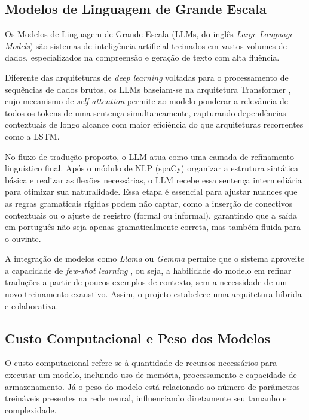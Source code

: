 \documentclass[
    12pt,                %
    openright,           %
    oneside,             %
    a4paper,             %
    english,             %
    brazil               %
]{abntex2}
\begin{document}
\subsection{Modelos de Linguagem de Grande Escala}

Os Modelos de Linguagem de Grande Escala (LLMs, do inglês \textit{Large Language Models}) são sistemas de inteligência artificial treinados em vastos volumes de dados, especializados na compreensão e geração de texto com alta fluência. 

Diferente das arquiteturas de \textit{deep learning} voltadas para o processamento de sequências de dados brutos, os LLMs baseiam-se na arquitetura Transformer \cite{Vaswani2017}, cujo mecanismo de \textit{self-attention} permite ao modelo ponderar a relevância de todos os tokens de uma sentença simultaneamente, capturando dependências contextuais de longo alcance com maior eficiência do que arquiteturas recorrentes como a LSTM.

No fluxo de tradução proposto, o LLM atua como uma camada de refinamento linguístico final. Após o módulo de NLP (spaCy) organizar a estrutura sintática básica e realizar as flexões necessárias, o LLM recebe essa sentença intermediária para otimizar sua naturalidade. Essa etapa é essencial para ajustar nuances que as regras gramaticais rígidas podem não captar, como a inserção de conectivos contextuais ou o ajuste de registro (formal ou informal), garantindo que a saída em português não seja apenas gramaticalmente correta, mas também fluida para o ouvinte.

A integração de modelos como \textit{Llama} \cite{Touvron2023} ou \textit{Gemma} \cite{GemmaTeam2024} permite que o sistema aproveite a capacidade de \textit{few-shot learning} \cite{Brown2020}, ou seja, a habilidade do modelo em refinar traduções a partir de poucos exemplos de contexto, sem a necessidade de um novo treinamento exaustivo. Assim, o projeto estabelece uma arquitetura híbrida e colaborativa.

\subsection{Custo Computacional e Peso dos Modelos}

O custo computacional refere-se à quantidade de recursos necessários para executar um modelo, incluindo uso de memória, processamento e capacidade de armazenamento. Já o peso do modelo está relacionado ao número de parâmetros treináveis presentes na rede neural, influenciando diretamente seu tamanho e complexidade.
\end{document}
